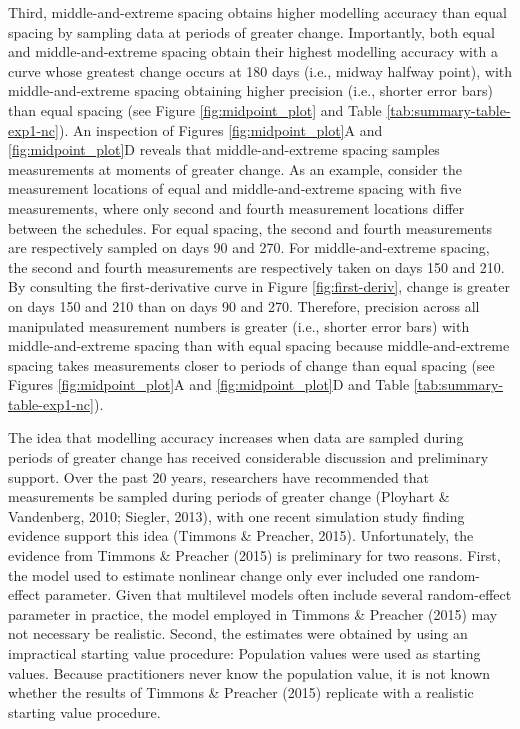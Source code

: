 \documentclass[
12pt, %
twoside,
english]{guelphthesis}
\theoremstyle{definition}
\theoremstyle{definition}
\theoremstyle{definition}
\theoremstyle{definition}
\theoremstyle{remark}
\begin{document}
Third, middle-and-extreme spacing obtains higher modelling accuracy than equal spacing by sampling data at periods of greater change. Importantly, both equal and middle-and-extreme spacing obtain their highest modelling accuracy with a curve whose greatest change occurs at 180 days (i.e., midway halfway point), with middle-and-extreme spacing obtaining higher precision (i.e., shorter error bars) than equal spacing (see Figure \ref{fig:midpoint_plot} and Table \ref{tab:summary-table-exp1-nc}). An inspection of Figures \ref{fig:midpoint_plot}A and \ref{fig:midpoint_plot}D reveals that middle-and-extreme spacing samples measurements at moments of greater change. As an example, consider the measurement locations of equal and middle-and-extreme spacing with five measurements, where only second and fourth measurement locations differ between the schedules. For equal spacing, the second and fourth measurements are respectively sampled on days 90 and 270. For middle-and-extreme spacing, the second and fourth measurements are respectively taken on days 150 and 210. By consulting the first-derivative curve in Figure \ref{fig:first-deriv}, change is greater on days 150 and 210 than on days 90 and 270. Therefore, precision across all manipulated measurement numbers is greater (i.e., shorter error bars) with middle-and-extreme spacing than with equal spacing because middle-and-extreme spacing takes measurements closer to periods of change than equal spacing (see Figures \ref{fig:midpoint_plot}A and \ref{fig:midpoint_plot}D and Table \ref{tab:summary-table-exp1-nc}).

The idea that modelling accuracy increases when data are sampled during periods of greater change has received considerable discussion and preliminary support. Over the past 20 years, researchers have recommended that measurements be sampled during periods of greater change (Ployhart \& Vandenberg, 2010; Siegler, 2013), with one recent simulation study finding evidence support this idea (Timmons \& Preacher, 2015). Unfortunately, the evidence from Timmons \& Preacher (2015) is preliminary for two reasons. First, the model used to estimate nonlinear change only ever included one random-effect parameter. Given that multilevel models often include several random-effect parameter in practice, the model employed in Timmons \& Preacher (2015) may not necessary be realistic. Second, the estimates were obtained by using an impractical starting value procedure: Population values were used as starting values. Because practitioners never know the population value, it is not known whether the results of Timmons \& Preacher (2015) replicate with a realistic starting value procedure.
\end{document}
